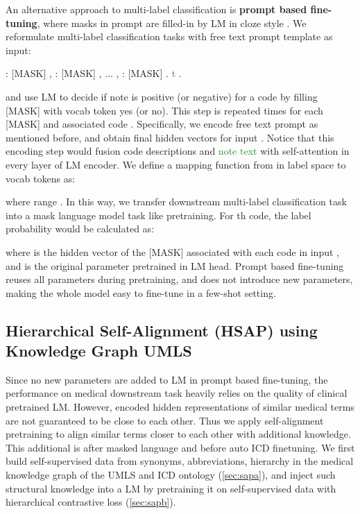 \documentclass[11pt]{article}
\begin{document}
An alternative approach to multi-label classification is \textbf{prompt based fine-tuning}, where masks in prompt are filled-in by LM in cloze style \citep{gao-etal-2021-making}. We reformulate multi-label classification tasks with free text prompt template as input:


\vspace{3mm}
\footnotesize 
\hspace{-4mm}
\textcolor{BrickRed}{} : [MASK] , \textcolor{BrickRed}{} : [MASK] , ... ,  \textcolor{BrickRed}{} : [MASK] .  \textcolor{ForestGreen}{t} . 

\vspace{3mm}
\normalsize

\noindent and use LM to decide if note is positive (or negative) for a code by filling [MASK] with vocab token yes (or no). This step is repeated  times for each [MASK] and associated code \textcolor{BrickRed}{}. 
Specifically, 
we encode free text prompt as mentioned before, and obtain final hidden vectors  for input . Notice that this encoding step would \textcolor{CarnationPink}{fusion} \textcolor{BrickRed}{code descriptions} and \textcolor{ForestGreen}{note text} with self-attention in every layer of LM encoder. 
We define a mapping function  from  in label space to vocab tokens as:



\noindent where  range . In this way, we transfer downstream multi-label classification task into a mask language model task like pretraining. For th code, the label probability would be calculated as:

\small

\normalsize

\noindent where  is the hidden vector of the [MASK] associated with each code \textcolor{BrickRed}{} in input , and  is the original parameter pretrained in LM head. Prompt based fine-tuning reuses all parameters during pretraining, and does not introduce new parameters, making the whole model easy to fine-tune in a few-shot setting. 

\subsection{Hierarchical Self-Alignment  (HSAP) using Knowledge Graph UMLS}
Since no new parameters are added to LM in prompt based fine-tuning, the performance on medical downstream task heavily relies on the quality of clinical pretrained LM. However, encoded hidden representations of similar medical terms are not guaranteed to be close to each other. Thus we apply self-alignment pretraining \citep{liu-etal-2021-self} to align similar terms closer to each other with additional knowledge. This additional  is after masked language  and before auto ICD finetuning.
We first build self-supervised data from synonyms, abbreviations, hierarchy in the medical knowledge graph of the UMLS and ICD ontology (\textsection \ref{sec:sapa}), and inject such structural knowledge into a LM by pretraining it on self-supervised data with hierarchical contrastive loss (\textsection \ref{sec:sapb}).
\end{document}
